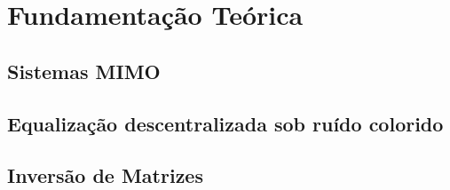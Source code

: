 \chapter{Fundamentação Teórica}


\section{Sistemas MIMO}\label{sec:sistemas-MIMO}




\section{Equalização descentralizada sob ruído colorido}\label{sec:dbp-ruido}




\section{Inversão de Matrizes}\label{sec:inversao}
